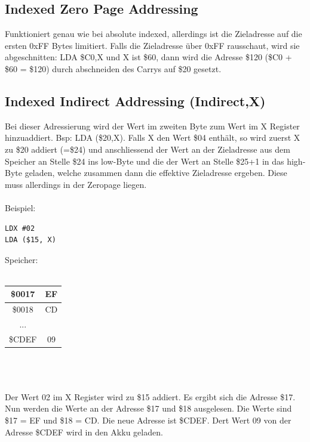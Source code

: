 \documentclass[a4paper,10pt]{report}
\begin{document}
\subsection{Indexed Zero Page Addressing}
Funktioniert genau wie bei absolute indexed, allerdings ist die Zieladresse auf die ersten 0xFF Bytes limitiert. Falls die Zieladresse über 0xFF rausschaut, wird sie abgeschnitten: LDA \$C0,X und X ist \$60, dann wird die Adresse \$120 (\$C0 + \$60 = \$120) durch abschneiden des Carrys auf \$20 gesetzt.
\subsection{Indexed Indirect Addressing (Indirect,X)}
Bei dieser Adressierung wird der Wert im zweiten Byte zum Wert im X Register hinzuaddiert. Bsp: LDA (\$20,X). Falls X den Wert \$04 enthält, so wird zuerst X zu \$20 addiert (=\$24) und anschliessend der Wert an der Zieladresse aus dem Speicher an Stelle \$24 ins low-Byte und die der Wert an Stelle \$25+1 in das high-Byte geladen, welche zusammen dann die effektive Zieladresse ergeben. Diese muss allerdings in der Zeropage liegen.
\\\\
Beispiel:\\
\begin{lstlisting}[]
LDX #02
LDA ($15, X)
\end{lstlisting}
Speicher:
\\
\\
\begin{tabular}{|c|c|}
\hline
\$0017 &EF  \\ \hline
\$0018 &CD \\ \hline
... &  \\  \hline 
\$CDEF &09  \\ \hline
\end{tabular}
\\
\\
\\
Der Wert 02 im X Register wird zu \$15 addiert. Es ergibt sich die Adresse \$17. \\
Nun werden die Werte an der Adresse \$17 und \$18 ausgelesen. Die Werte sind \$17 = EF und \$18 = CD.
Die neue Adresse ist \$CDEF. Dert Wert 09 von der Adresse \$CDEF wird in den Akku geladen.
\end{document}

